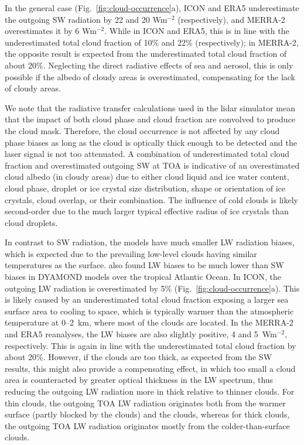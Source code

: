 \documentclass[draft]{agujournal2019}
\begin{document}
In the general case (Fig.~\ref{fig:cloud-occurrence}a), ICON and ERA5 underestimate the outgoing SW radiation by 22 and 20 Wm$^{-2}$ (respectively), and MERRA-2 overestimates it by 6 Wm$^{-2}$. While in ICON and ERA5, this is in line with the underestimated total cloud fraction of 10\% and 22\% (respectively); in MERRA-2, the opposite result is expected from the underestimated total cloud fraction of about 20\%. Neglecting the direct radiative effects of sea and aerosol, this is only possible if the albedo of cloudy areas is overestimated, compensating for the lack of cloudy areas.

We note that the radiative transfer calculations used in the lidar simulator mean that the impact of both cloud phase and cloud fraction are convolved to produce the cloud mask. Therefore, the cloud occurrence is not affected by any cloud phase biases as long as the cloud is optically thick enough to be detected and the laser signal is not too attenuated. A combination of underestimated total cloud fraction and overestimated outgoing SW at TOA is indicative of an overestimated cloud albedo (in cloudy areas) due to either cloud liquid and ice water content, cloud phase, droplet or ice crystal size distribution, shape or orientation of ice crystals, cloud overlap, or their combination. The influence of cold clouds is likely second-order due to the much larger typical effective radius of ice crystals than cloud droplets.

In contrast to SW radiation, the models have much smaller LW radiation biases, which is expected due to the prevailing low-level clouds having similar temperatures as the surface.  also found LW biases to be much lower than SW biases in DYAMOND models over the tropical Atlantic Ocean. In ICON, the outgoing LW radiation is overestimated by 5\% (Fig.~\ref{fig:cloud-occurrence}a). This is likely caused by an underestimated total cloud fraction exposing a larger sea surface area to cooling to space, which is typically warmer than the atmospheric temperature at 0--2~km, where most of the clouds are located. In the MERRA-2 and ERA5 reanalyses, the LW biases are also slightly positive, 4 and 5~Wm$^{-2}$, respectively. This is again in line with the underestimated total cloud fraction by about 20\%. However, if the clouds are too thick, as expected from the SW results, this might also provide a compensating effect, in which too small a cloud area is counteracted by greater optical thickness in the LW spectrum, thus reducing the outgoing LW radiation more in thick relative to thinner clouds. For thin clouds, the outgoing TOA LW radiation originates both from the warmer surface (partly blocked by the clouds) and the clouds, whereas for thick clouds, the outgoing TOA LW radiation originates mostly from the colder-than-surface clouds.
\end{document}
